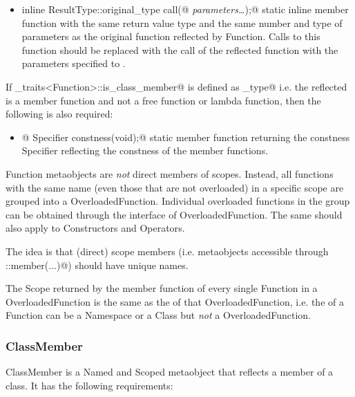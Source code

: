 \begin{itemize}
	\item{\verb@static inline ResultType::original_type call(@ {\em parameters\dots}\verb@);@}
	static inline member function with the same return value type and the same number
	and type of parameters as the original function reflected by {\metaobject Function}.
	Calls to this function should be replaced with the call of the reflected function
	with the parameters specified to \verb@call@.
\end{itemize}

If \verb@metaobject_traits<Function>::is_class_member@ is defined as \verb@true_type@
i.e. the reflected is a member function and not a free function or lambda function,
then the following is also required:

\begin{itemize}
	\item{\verb@static @ {\metaobject Specifier} \verb@ constness(void);@} static member function
	returning  the constness {\metaobject Specifier} reflecting the constness
	of the member functions.
\end{itemize}

{\metaobject Function} metaobjects are {\em not} direct members of scopes. Instead,
all functions with the same name (even those that are not overloaded) in a specific scope
are grouped into a {\metaobject OverloadedFunction}. Individual overloaded functions
in the group can be obtained through the interface of {\metaobject OverloadedFunction}.
The same should also apply to {\metaobject Constructor}s and {\metaobject Operator}s.

The idea is that (direct) scope members (i.e. metaobjects accessible through \verb@Scope::member(...)@)
should have unique names.

The {\metaobject Scope} returned by the \verb@scope@ member function of every single
{\metaobject Function} in a {\metaobject OverloadedFunction}
is the same as the \verb@scope@ of that {\metaobject OverloadedFunction}, i.e.
the \verb@scope@ of a {\metaobject Function} can be a {\metaobject Namespace} or a {\metaobject Class}
but {\em not} a {\metaobject OverloadedFunction}.

\subsubsection{ClassMember}

{\metaobject ClassMember} is a {\metaobject Named} and {\metaobject Scoped} metaobject
that reflects a member of a class. It has the following requirements:

